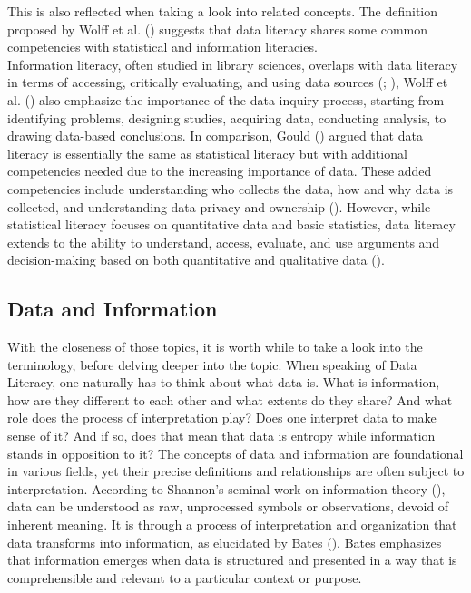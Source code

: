 \documentclass[
  12pt,
  a4paper,
  twoside]{article}
\begin{document}
This is also reflected when taking a look into related concepts. The definition proposed by Wolff et al. () suggests that data literacy shares some common competencies with statistical and information literacies.\\
Information literacy, often studied in library sciences, overlaps with data literacy in terms of accessing, critically evaluating, and using data sources (; ), Wolff et al. () also emphasize the importance of the data inquiry process, starting from identifying problems, designing studies, acquiring data, conducting analysis, to drawing data-based conclusions.
In comparison, Gould () argued that data literacy is essentially the same as statistical literacy but with additional competencies needed due to the increasing importance of data. These added competencies include understanding who collects the data, how and why data is collected, and understanding data privacy and ownership ().
However, while statistical literacy focuses on quantitative data and basic statistics, data literacy extends to the ability to understand, access, evaluate, and use arguments and decision-making based on both quantitative and qualitative data ().

\subsection{Data and Information}\label{data-and-information}

With the closeness of those topics, it is worth while to take a look into the terminology, before delving deeper into the topic.
When speaking of Data Literacy, one naturally has to think about what data is. What is information, how are they different to each other and what extents do they share? And what role does the process of interpretation play? Does one interpret data to make sense of it? And if so, does that mean that data is entropy while information stands in opposition to it?
The concepts of data and information are foundational in various fields, yet their precise definitions and relationships are often subject to interpretation. According to Shannon's seminal work on information theory (), data can be understood as raw, unprocessed symbols or observations, devoid of inherent meaning. It is through a process of interpretation and organization that data transforms into information, as elucidated by Bates (). Bates emphasizes that information emerges when data is structured and presented in a way that is comprehensible and relevant to a particular context or purpose.
\end{document}

